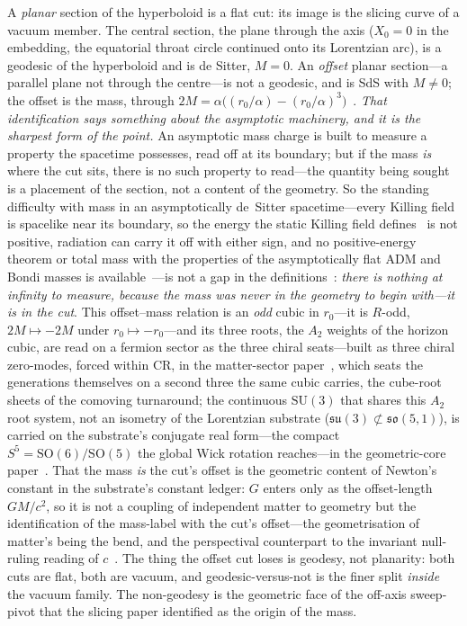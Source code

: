 \documentclass[11pt,a4paper]{article}
\theoremstyle{definition}
\begin{document}
A \emph{planar} section of the hyperboloid is a flat cut: its image is the slicing curve of a vacuum member. The central section, the plane through the axis ($X_{0}=0$ in the embedding, the equatorial throat circle continued onto its Lorentzian arc), is a geodesic of the hyperboloid and is de Sitter, $M=0$. An \emph{offset} planar section---a parallel plane not through the centre---is not a geodesic, and is SdS with $M\neq0$; the offset is the mass, through $2M=\alpha\bigl((r_{0}/\alpha)-(r_{0}/\alpha)^{3}\bigr)$~\cite{JanzenSlicing}. \emph{That identification says something about the asymptotic machinery, and it is the sharpest form of the point.} An asymptotic mass charge is built to measure a property the spacetime possesses, read off at its boundary; but if the mass \emph{is} where the cut sits, there is no such property to read---the quantity being sought is a placement of the section, not a content of the geometry. So the standing difficulty with mass in an asymptotically de~Sitter spacetime---every Killing field is spacelike near its boundary, so the energy the static Killing field defines~\cite{AbbottDeser1982} is not positive, radiation can carry it off with either sign, and no positive-energy theorem or total mass with the properties of the asymptotically flat ADM and Bondi masses is available~\cite{AshtekarBongaKesavan2015}---is not a gap in the definitions~\cite{JanzenCRframework}: \emph{there is nothing at infinity to measure, because the mass was never in the geometry to begin with---it is in the cut}. This offset--mass relation is an \emph{odd} cubic in $r_{0}$---it is $R$-odd, $2M\mapsto-2M$ under $r_{0}\mapsto-r_{0}$---and its three roots, the $A_2$ weights of the horizon cubic, are read on a fermion sector as the three chiral seats---built as three chiral zero-modes, forced within CR, in the matter-sector paper~\cite{JanzenMatter}, which seats the generations themselves on a second three the same cubic carries, the cube-root sheets of the comoving turnaround; the continuous $\mathrm{SU}(3)$ that shares this $A_2$ root system, not an isometry of the Lorentzian substrate ($\mathfrak{su}(3)\not\subset\mathfrak{so}(5,1)$), is carried on the substrate's conjugate real form---the compact $S^{5}=\mathrm{SO}(6)/\mathrm{SO}(5)$ the global Wick rotation reaches---in the geometric-core paper~\cite{JanzenGeometricCore}. That the mass \emph{is} the cut's offset is the geometric content of Newton's constant in the substrate's constant ledger: $G$ enters only as the offset-length $GM/c^2$, so it is not a coupling of independent matter to geometry but the identification of the mass-label with the cut's offset---the geometrisation of matter's being the bend, and the perspectival counterpart to the invariant null-ruling reading of $c$~\cite{JanzenGeometricCore}. The thing the offset cut loses is geodesy, not planarity: both cuts are flat, both are vacuum, and geodesic-versus-not is the finer split \emph{inside} the vacuum family. The non-geodesy is the geometric face of the off-axis sweep-pivot that the slicing paper identified as the origin of the mass.
\end{document}
